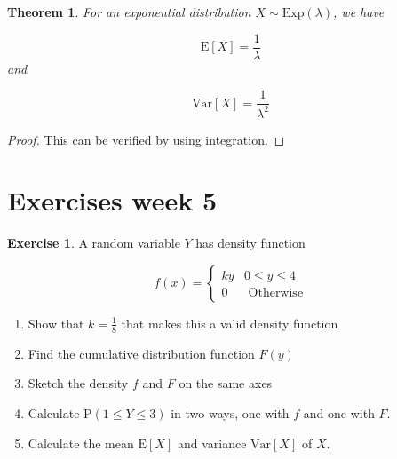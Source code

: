 \documentclass[
]{book}
\newtheorem{theorem}{Theorem}[chapter]
\theoremstyle{definition}
\theoremstyle{definition}
\theoremstyle{definition}
\newtheorem{exercise}{Exercise}[chapter]
\theoremstyle{definition}
\theoremstyle{remark}
\begin{document}
\begin{theorem}
For an exponential distribution \(X\sim \text{Exp}(\lambda)\), we have

\[\text{E}[X] = \frac{1}{\lambda}\]
and

\[\text{Var}[X] = \frac{1}{\lambda ^2}\]
\end{theorem}

\begin{proof}
This can be verified by using integration.
\end{proof}

\hypertarget{exercises-week-5}{%
\section{Exercises week 5}\label{exercises-week-5}}

\begin{exercise}

A random variable \(Y\) has density function

\begin{equation*}
  f(x)=\begin{cases}
        ky & 0 \leq y \leq 4 \\
        0 &  \text{     Otherwise}
  \end{cases}
\end{equation*}

\begin{enumerate}
\def\labelenumi{\alph{enumi})}
\item
  Show that \(k = \frac{1}{8}\) that makes this a valid density function
\item
  Find the cumulative distribution function \(F(y)\)
\item
  Sketch the density \(f\) and \(F\) on the same axes
\item
  Calculate \(\text{P}(1\leq Y \leq 3)\) in two ways, one with \(f\) and one with \(F\).
\item
  Calculate the mean \(\text{E}[X]\) and variance \(\text{Var}[X]\) of \(X\).
\end{enumerate}

\end{exercise}
\end{document}
